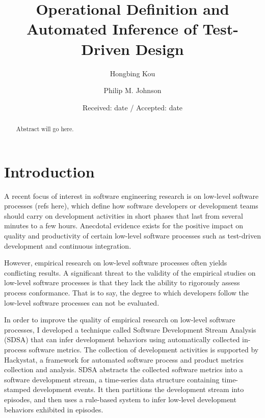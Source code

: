 \documentclass[smallextended]{svjour3}     %
\begin{document}
\title{Operational Definition and Automated Inference of Test-Driven Design}
\author{Hongbing Kou \and Philip M. Johnson}

\date{Received: date / Accepted: date}

\maketitle

\begin{abstract}
Abstract will go here. 
\end{abstract}

\section{Introduction}
\label{intro}

A recent focus of interest in software engineering research is on low-level
software processes (refs here), which define how software developers or development
teams should carry on development activities in short phases that last from
several minutes to a few hours. Anecdotal evidence exists for the positive
impact on quality and productivity of certain low-level software processes
such as test-driven development and continuous integration. 

However, empirical research on low-level software processes often yields
conflicting results. A significant threat to the validity of the empirical
studies on low-level software processes is that they lack the ability to
rigorously assess process conformance. That is to say, the degree to which
developers follow the low-level software processes can not be evaluated. 

In order to improve the quality of empirical research on low-level software
processes, I developed a technique called Software Development Stream
Analysis (SDSA) that can infer development behaviors using automatically
collected in-process software metrics. The collection of development
activities is supported by Hackystat, a framework for automated software
process and product metrics collection and analysis. SDSA abstracts the
collected software metrics into a software development stream, a
time-series data structure containing time-stamped development events. It
then partitions the development stream into episodes, and then uses a
rule-based system to infer low-level development behaviors exhibited in
episodes. 
\end{document}
